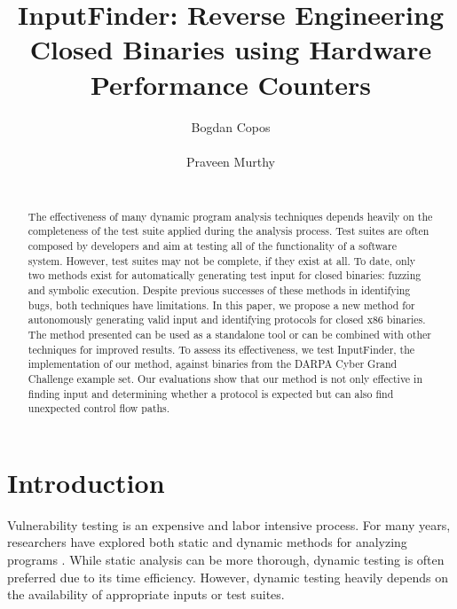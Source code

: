 \documentclass{sig-alternate-05-2015}
\def \tool {InputFinder}
\begin{document}
\title{InputFinder: Reverse Engineering Closed Binaries using Hardware Performance Counters}
\author{
\alignauthor
Bogdan Copos\\
	\\
\alignauthor
Praveen Murthy\\
	\\
}
\maketitle

\begin{abstract}
The effectiveness of many dynamic program analysis techniques depends heavily on the completeness of the test suite applied during the analysis process.
Test suites are often composed by developers and aim at testing all of the functionality of a software system.
However, test suites may not be complete, if they exist at all.
To date, only two methods exist for automatically generating test input for closed binaries: fuzzing and symbolic execution.
Despite previous successes of these methods in identifying bugs, both techniques have limitations.
In this paper, we propose a new method for autonomously generating valid input and identifying protocols for closed x86 binaries.
The method presented can be used as a standalone tool or can be combined with other techniques for improved results.
To assess its effectiveness, we test \tool{}, the implementation of our method, against binaries from the DARPA Cyber Grand Challenge example set.
Our evaluations show that our method is not only effective in finding input and determining whether a protocol is expected but can also find unexpected control flow paths.
\end{abstract}

\section{Introduction}
Vulnerability testing is an expensive and labor intensive process.
For many years, researchers have explored both static and dynamic methods for analyzing programs \cite{smartfuzzer}.
While static analysis can be more thorough, dynamic testing is often preferred due to its time efficiency.
However, dynamic testing heavily depends on the availability of appropriate inputs or test suites.
\end{document}
